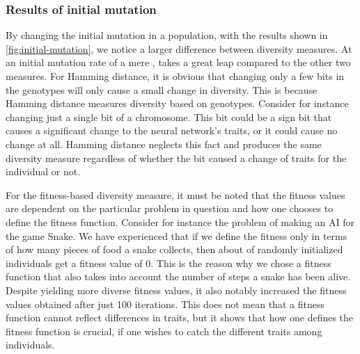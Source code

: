 \subsubsection{Results of initial mutation} By changing the initial mutation in a population, with the results shown in \cref{fig:initial-mutation}, we notice a larger difference between diversity measures. At an initial mutation rate of a mere , \dia{} takes a great leap compared to the other two measures. For Hamming distance, it is obvious that changing only a few bits in the genotypes will only cause a small change in diversity. This is because Hamming distance measures diversity based on genotypes. Consider for instance changing just a single bit of a chromosome. This bit could be a sign bit that causes a significant change to the neural network's traits, or it could cause no change at all. Hamming distance neglects this fact and produces the same diversity measure regardless of whether the bit caused a change of traits for the individual or not.

For the fitness-based diversity measure, it must be noted that the fitness values are dependent on the particular problem in question and how one chooses to define the fitness function. Consider for instance the problem of making an AI for the game Snake. We have experienced that if we define the fitness only in terms of how many pieces of food a snake collects, then about  of randomly initialized individuals get a fitness value of 0. This is the reason why we chose a fitness function that also takes into account the number of steps a snake has been alive. Despite yielding more diverse fitness values, it also notably increased the fitness values obtained after just 100 iterations. This does not mean that a fitness function cannot reflect differences in traits, but it shows that how one defines the fitness function is crucial, if one wishes to catch the different traits among individuals.
%

